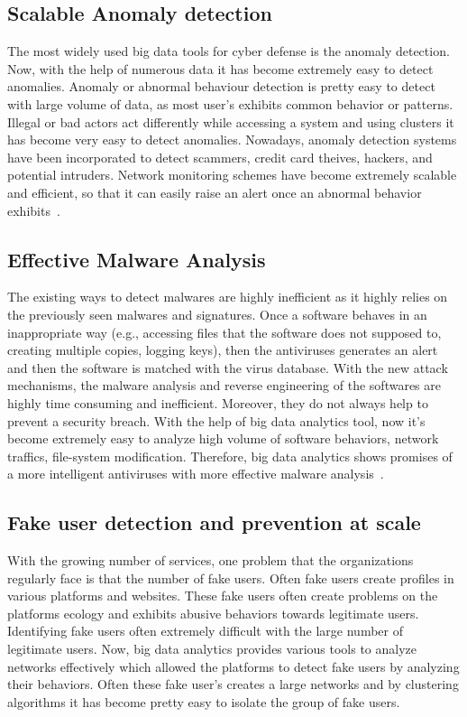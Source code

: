 \documentclass[sigconf]{acmart}
\begin{document}
\subsection*{Scalable Anomaly detection}
The most widely used big data tools for cyber defense is the anomaly detection. Now, with the help of numerous data it has become extremely easy to detect anomalies. Anomaly or abnormal behaviour detection is pretty easy to detect with large volume of data, as most user's exhibits common behavior or patterns. Illegal or bad actors act differently while accessing a system and using clusters it has become very easy to detect anomalies. Nowadays, anomaly detection systems have been incorporated to detect scammers, credit card theives, hackers, and potential intruders. Network monitoring schemes have become extremely scalable and efficient, so that it can easily raise an alert once an abnormal behavior exhibits~\cite{Razar:2016,Rettig}. 

\subsection*{Effective Malware Analysis}
The existing ways to detect malwares are highly inefficient as it highly relies on the previously seen malwares and signatures. Once a software behaves in an inappropriate way (e.g., accessing files that the software does not supposed to, creating multiple copies, logging keys), then the antiviruses generates an alert and then the software is matched with the virus database. With the new attack mechanisms, the malware analysis and reverse engineering of the softwares are highly time consuming and inefficient. Moreover, they do not always help to prevent a security breach. With the help of big data analytics tool, now it's become extremely easy to analyze high volume of software behaviors, network traffics, file-system modification. Therefore, big data analytics shows promises of a more intelligent antiviruses with more effective malware analysis~\cite{malware2}. 

\subsection*{Fake user detection and prevention at scale}
With the growing number of services, one problem that the organizations regularly face is that the number of fake users. Often fake users create profiles in various platforms and websites. These fake users often create problems on the platforms ecology and exhibits abusive behaviors towards legitimate users. Identifying fake users often extremely difficult with the large number of legitimate users. Now, big data analytics provides various tools to analyze networks effectively which allowed the platforms to detect fake users by analyzing their behaviors. Often these fake user's creates a large networks and by clustering algorithms it has become pretty easy to isolate the group of fake users. 
\end{document}
